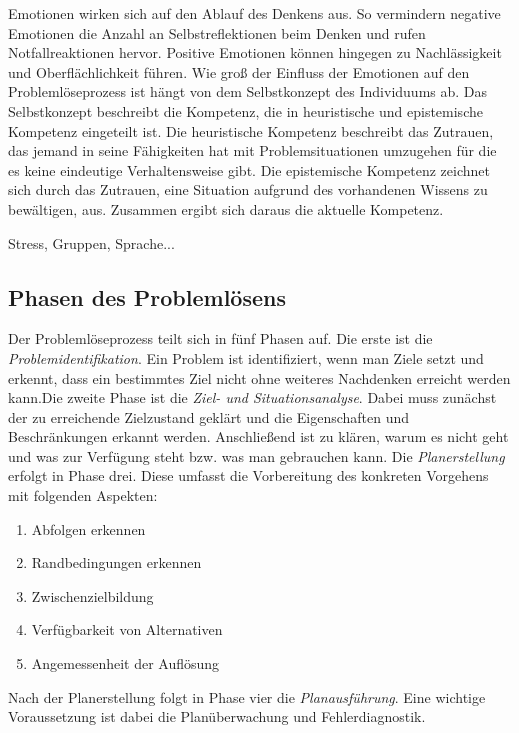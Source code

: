 Emotionen wirken sich auf den Ablauf des Denkens aus. So vermindern negative Emotionen die Anzahl an Selbstreflektionen beim Denken und rufen Notfallreaktionen hervor. Positive Emotionen können hingegen zu Nachlässigkeit und Oberflächlichkeit führen. Wie groß der Einfluss der Emotionen auf den Problemlöseprozess ist hängt von dem Selbstkonzept des Individuums ab. Das Selbstkonzept beschreibt die Kompetenz, die in heuristische und epistemische Kompetenz eingeteilt ist. Die heuristische Kompetenz beschreibt das Zutrauen, das jemand in seine Fähigkeiten hat mit Problemsituationen umzugehen für die es keine eindeutige Verhaltensweise gibt. Die epistemische Kompetenz zeichnet sich durch das Zutrauen, eine Situation aufgrund des vorhandenen Wissens zu bewältigen, aus. Zusammen ergibt sich daraus die aktuelle Kompetenz. \cite{Dorner1984}

Stress, Gruppen, Sprache...

\subsection{Phasen des Problemlösens}
Der Problemlöseprozess teilt sich in fünf Phasen auf. Die erste ist die \textit{Problemidentifikation}. \glqq Ein Problem ist identifiziert, wenn man Ziele setzt und erkennt, dass ein bestimmtes Ziel nicht ohne weiteres Nachdenken erreicht werden kann.\grqq Die zweite Phase ist die \textit{Ziel- und Situationsanalyse}. Dabei muss zunächst der zu erreichende Zielzustand geklärt und die Eigenschaften und Beschränkungen erkannt werden. Anschließend ist zu klären, warum es nicht geht und was zur Verfügung steht bzw. was man gebrauchen kann. Die \textit{Planerstellung} erfolgt in Phase drei. Diese umfasst die Vorbereitung des konkreten Vorgehens mit folgenden Aspekten:
\begin{enumerate}
\item Abfolgen erkennen
\item Randbedingungen erkennen
\item Zwischenzielbildung
\item Verfügbarkeit von Alternativen
\item Angemessenheit der Auflösung
\end{enumerate}
Nach der Planerstellung folgt in Phase vier die \textit{Planausführung}. Eine wichtige Voraussetzung ist dabei die Planüberwachung und Fehlerdiagnostik.  \cite{Betsch2011}

